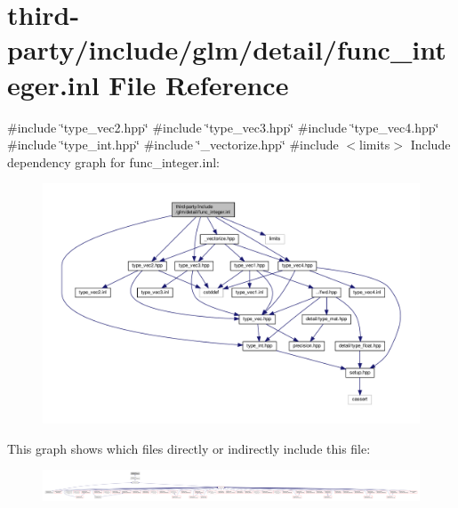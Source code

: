 \hypertarget{func__integer_8inl}{}\section{third-\/party/include/glm/detail/func\+\_\+integer.inl File Reference}
\label{func__integer_8inl}
{\ttfamily \#include \char`\"{}type\+\_\+vec2.\+hpp\char`\"{}}\newline
{\ttfamily \#include \char`\"{}type\+\_\+vec3.\+hpp\char`\"{}}\newline
{\ttfamily \#include \char`\"{}type\+\_\+vec4.\+hpp\char`\"{}}\newline
{\ttfamily \#include \char`\"{}type\+\_\+int.\+hpp\char`\"{}}\newline
{\ttfamily \#include \char`\"{}\+\_\+vectorize.\+hpp\char`\"{}}\newline
{\ttfamily \#include $<$limits$>$}\newline
Include dependency graph for func\+\_\+integer.\+inl\+:
\nopagebreak
\begin{figure}[H]
\begin{center}
\leavevmode
\includegraphics[width=350pt]{func__integer_8inl__incl}
\end{center}
\end{figure}
This graph shows which files directly or indirectly include this file\+:
\nopagebreak
\begin{figure}[H]
\begin{center}
\leavevmode
\includegraphics[width=350pt]{func__integer_8inl__dep__incl}
\end{center}
\end{figure}
